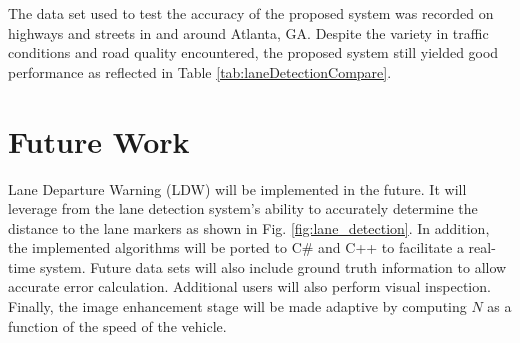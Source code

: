 \documentclass{article}
\begin{document}
The data set used to test the accuracy of the proposed system was recorded on highways and streets in and around Atlanta, GA. Despite the variety in traffic conditions and road quality encountered, the proposed system still yielded good performance as reflected in Table \ref{tab:laneDetectionCompare}.

\section{Future Work}
\label{sec:print}
Lane Departure Warning (LDW) will be implemented in the future. It will leverage from the lane detection system's ability to accurately determine the distance to the lane markers as shown in Fig. \ref{fig:lane_detection}. In addition, the implemented algorithms will be ported to C\# and C++ to facilitate a real-time system. Future data sets will also include ground truth information to allow accurate error calculation. Additional users will also perform visual inspection. Finally, the image enhancement stage will be made adaptive by computing $N$ as a function of the speed of the vehicle.

\small


\end{document}
